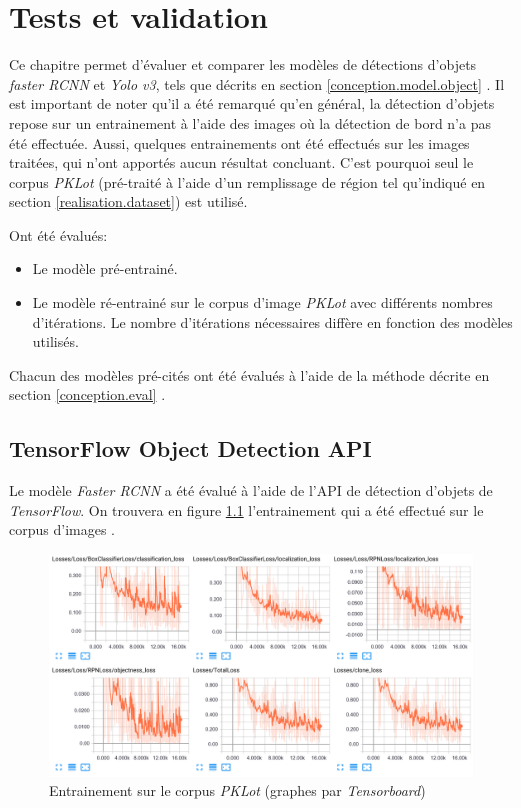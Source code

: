 \chapter{Tests et validation}\label{tests}
Ce chapitre permet d'évaluer et comparer les modèles de détections d'objets \textit{faster RCNN} et \textit{Yolo v3}, tels que décrits en section \ref{conception.model.object} . Il est important de noter qu'il a été remarqué qu'en général, la détection d'objets repose sur un entrainement à l'aide des images où la détection de bord n'a pas été effectuée. Aussi, quelques entrainements ont été effectués sur les images traitées, qui n'ont apportés aucun résultat concluant. C'est pourquoi seul le corpus \textit{PKLot} (pré-traité à l'aide d'un remplissage de région tel qu'indiqué en section \ref{realisation.dataset}) est utilisé.

Ont été évalués:
\begin{itemize}
    \item Le modèle pré-entrainé.
    \item Le modèle ré-entrainé sur le corpus d'image \textit{PKLot} avec différents nombres d'itérations. Le nombre d'itérations nécessaires diffère en fonction des modèles utilisés.
\end{itemize}

Chacun des modèles pré-cités ont été évalués à l'aide de la méthode décrite en section \ref{conception.eval} . 

\section{TensorFlow Object Detection API}
Le modèle \textit{Faster RCNN} a été évalué à l'aide de l'API de détection d'objets de \textit{TensorFlow}. On trouvera en figure \ref{fig:tensorflow_train} l'entrainement qui a été effectué sur le corpus d'images .

\begin{figure}[H]
    \includegraphics[width=15cm]{img/tests/tensorflow_pklot_full_train.png}
    \centering
    \caption{Entrainement sur le corpus \textit{PKLot} (graphes par \textit{Tensorboard})}
    \label{fig:tensorflow_train}
\end{figure} 

